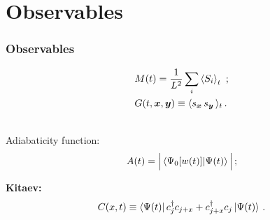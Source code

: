 \section{Observables}

\begin{frame}
	\frametitle{Observables}

	\begin{center}
	\begin{align}
		&M(t) = \frac{1}{L^2} \sum_{i} \braket{S_i}_t \,\,; \\
		&G(t,{\bm x},{\bm y}) \equiv \langle s_{\bm x}\, s_{\bm y}\,
		\rangle_t \,.
	\end{align}
	\end{center}
	\begin{center}
	\\
	Adiabaticity function:
	\begin{eqnarray}
  		A(t) = \Big|\braket{ \Psi_0[w(t)] | \Psi(t) }\Big|\,;
  		\label{adtfunc}
	\end{eqnarray}
	\end{center}
	
	\begin{center}
	{\bf Kitaev:}
	\begin{align}
		C(x,t)  \equiv  \langle \Psi(t) |
  		\, c_j^\dagger c_{j+x} 
  		+ c_{j+x}^\dagger c_{j} \, | \Psi(t) \rangle \, \, . \notag
	\end{align}
	\end{center}
	
	
\end{frame}
